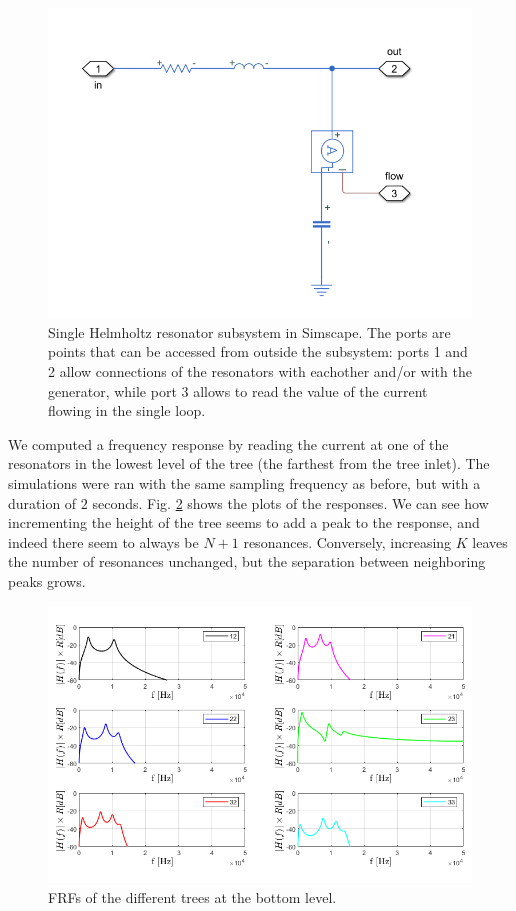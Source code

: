 \documentclass[a4paper]{article}
\begin{document}
\begin{figure}[h!]
	\centering
	\includegraphics[width=0.7\linewidth]{sims.png}
	\caption{Single Helmholtz resonator subsystem in Simscape. The ports are points that can be accessed from outside the subsystem: ports 1 and 2 allow connections of the resonators with eachother and/or with the generator, while port 3 allows to read the value of the current flowing in the single loop.}
	\label{fig:sims}
\end{figure}

We computed a frequency response by reading the current at one of the resonators in the lowest level of the tree (the farthest from the tree inlet). The simulations were ran with the same sampling frequency as before, but with a duration of $2$ seconds. Fig. \ref{fig:es2} shows the plots of the responses. We can see how incrementing the height of the tree seems to add a peak to the response, and indeed there seem to always be $N+1$ resonances. Conversely, increasing $K$ leaves the number of resonances unchanged, but the separation between neighboring peaks grows.



\begin{figure}[h!]
	\centering
	\includegraphics[width=0.8\linewidth]{es22.png}
	\caption{FRFs of the different trees at the bottom level.}
	\label{fig:es2}
\end{figure}
\end{document}
